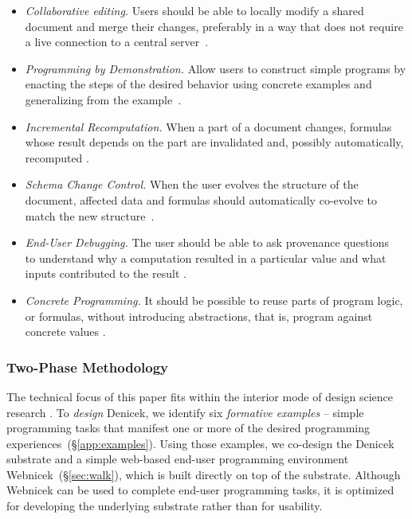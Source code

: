 \documentclass[sigconf,anonymous,screen]{acmart}
\begin{document}
\begin{itemize}
\item \emph{Collaborative editing.} Users should be able to locally modify a shared document
  and merge their changes, preferably in a way that does not require a live connection to a central server~\cite{kleppmann-2019-local}.
\item \emph{Programming by Demonstration.} Allow users to construct simple programs by
  enacting the steps of the desired behavior using concrete examples and generalizing from the example~\cite{leiva-2021-rapido,cypher-1993-pbd}.
\item \emph{Incremental Recomputation.} When a part of a document changes, formulas whose result
  depends on the part are invalidated and, possibly automatically, recomputed \cite{teitelbaum-1981-cps,mcdirmid-2013-usable,horowitz-2023-engraft}.
\item \emph{Schema Change Control.} When the user evolves the structure of the document, affected
  data and formulas should automatically co-evolve to match the new structure~\cite{litt-2020-cambria,edwards-2025-schema}.
\item \emph{End-User Debugging.} The user should be able to ask provenance questions~\cite{cheney-2009-provenance} to understand
  why a computation resulted in a particular value and what inputs contributed to the result \cite{ko-2009-whyline}.
\item \emph{Concrete Programming.} It should be possible to reuse parts of program logic, or formulas,
  without introducing abstractions, that is, program against concrete values \cite{edwards-2006-copypaste,edwards-2022-copypaste}.
\end{itemize}

\subsubsection*{Two-Phase Methodology}
The technical focus of this paper fits within the interior mode of design science research \cite{adam-2021-dsr}.
To \emph{design} Denicek, we identify six \emph{formative examples} -- simple programming
tasks that manifest one or more of the desired programming experiences~(\S\ref{app:examples}).
Using those examples, we co-design the Denicek substrate and a simple web-based end-user programming
environment Webnicek~(\S\ref{sec:walk}), which is built directly on top of the substrate. Although
Webnicek can be used to complete end-user programming tasks, it is optimized for developing the
underlying substrate rather than for usability.
\end{document}
